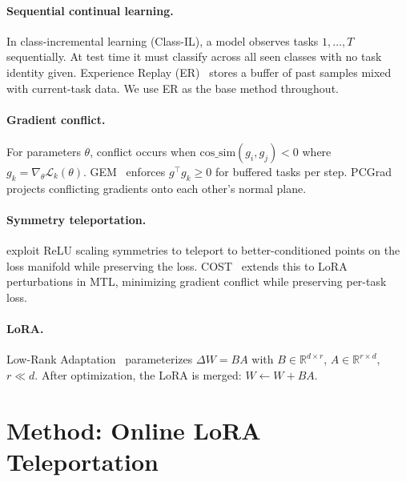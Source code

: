 \documentclass[11pt,a4paper]{article}
\newcommand{\cossim}{\mathrm{cos\_sim}}
\begin{document}
\paragraph{Sequential continual learning.}
In class-incremental learning (Class-IL), a model observes tasks $1, \ldots, T$ sequentially.
At test time it must classify across all seen classes with no task identity given.
Experience Replay (ER)~\citep{rolnick2019er} stores a buffer of past samples mixed with
current-task data. We use ER as the base method throughout.

\paragraph{Gradient conflict.}
For parameters $\theta$, conflict occurs when
$\cossim(g_i, g_j) < 0$ where $g_k = \nabla_\theta \mathcal{L}_k(\theta)$.
GEM~\citep{lopezpaz2017gem} enforces $g^\top g_k \geq 0$ for buffered tasks per step.
PCGrad~\citep{yu2020pcgrad} projects conflicting gradients onto each other's normal plane.

\paragraph{Symmetry teleportation.}
\citet{zhao2022teleport} exploit ReLU scaling symmetries to teleport to better-conditioned
points on the loss manifold while preserving the loss.
COST~\citep{zhou2025cost} extends this to LoRA perturbations in MTL,
minimizing gradient conflict while preserving per-task loss.

\paragraph{LoRA.}
Low-Rank Adaptation~\citep{hu2022lora} parameterizes $\Delta W = BA$ with
$B \in \mathbb{R}^{d \times r}$, $A \in \mathbb{R}^{r \times d}$, $r \ll d$.
After optimization, the LoRA is merged: $W \leftarrow W + BA$.

\section{Method: Online LoRA Teleportation}
\label{sec:method}
\end{document}
